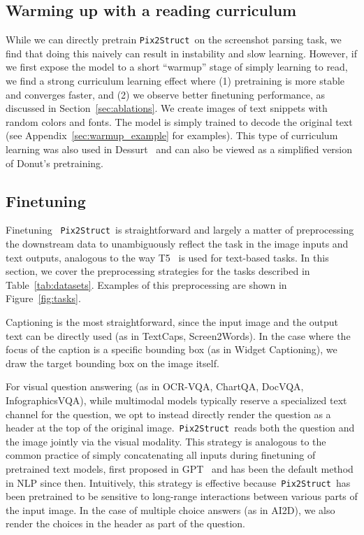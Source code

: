 \documentclass{article} \usepackage[accepted]{icml2023}
\newcommand\ourmodel{{\texttt{Pix2Struct}}}
\begin{document}
\subsection{Warming up with a reading curriculum}
\label{sec:curriculum}
While we can directly pretrain \ourmodel~on the screenshot parsing task, we find that doing this naively can result in instability and slow learning. However, if we first expose the model to a short ``warmup'' stage of simply learning to read, we find a strong curriculum learning effect where (1) pretraining is more stable and converges faster, and (2) we observe better finetuning performance, as discussed in Section~\ref{sec:ablations}. We create images of text snippets with random colors and fonts. The model is simply trained to decode the original text (see Appendix~\ref{sec:warmup_example} for examples). This type of curriculum learning was also used in Dessurt~\citep{dessurt} and can also be viewed as a simplified version of Donut's pretraining.

\subsection{Finetuning}
\label{sec:finetuning}
Finetuning ~\ourmodel~is straightforward and largely a matter of preprocessing the downstream data to unambiguously reflect the task in the image inputs and text outputs, analogous to the way T5~\citep{t5} is used for text-based tasks. In this section, we cover the preprocessing strategies for the tasks described in Table~\ref{tab:datasets}. Examples of this preprocessing are shown in Figure~\ref{fig:tasks}.

Captioning is the most straightforward, since the input image and the output text can be directly used (as in TextCaps, Screen2Words). In the case where the focus of the caption is a specific bounding box (as in Widget Captioning), we draw the target bounding box on the image itself.

For visual question answering (as in OCR-VQA, ChartQA, DocVQA, InfographicsVQA), while multimodal models typically reserve a specialized text channel for the question, we opt to instead directly render the question as a header at the top of the original image.~\ourmodel~reads both the question and the image jointly via the visual modality. This strategy is analogous to the common practice of simply concatenating all inputs during finetuning of pretrained text models, first proposed in GPT~\citep{gpt} and has been the default method in NLP since then. Intuitively, this strategy is effective because~\ourmodel~has been pretrained to be sensitive to long-range interactions between various parts of the input image. 
In the case of multiple choice answers (as in AI2D), we also render the choices in the header as part of the question.
\end{document}
